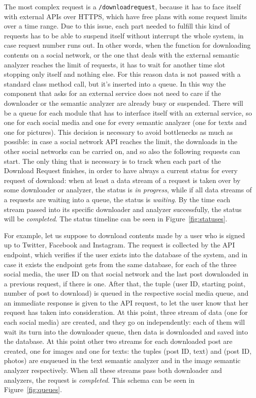 The most complex request is a \texttt{/downloadrequest}, because it has to face itself with external APIs over HTTPS, which have free plans with some request limits over a time range. Due to this issue, each part needed to fulfill this kind of requests has to be able to suspend itself without interrupt the whole system, in case request number runs out. In other words, when the function for downloading contents on a social network, or the one that deals with the external semantic analyzer reaches the limit of requests, it has to wait for another time slot stopping only itself and nothing else. For this reason data is not passed with a standard class method call, but it's inserted into a queue. In this way the component that asks for an external service does not need to care if the downloader or the semantic analyzer are already busy or suspended. There will be a queue for each module that has to interface itself with an external service, so one for each social media and one for every semantic analyzer (one for texts and one for pictures). This decision is necessary to avoid bottlenecks as much as possible: in case a social network API reaches the limit, the downloads in the other social networks can be carried on, and so also the following requests can start. The only thing that is necessary is to track when each part of the Download Request finishes, in order to have always a current status for every request of download: when at least a data stream of a request is taken over by some downloader or analyzer, the status is \emph{in progress}, while if all data streams of a requests are waiting into a queue, the status is \emph{waiting}. By the time each stream passed into its specific downloader and analyzer successfully, the status will be \emph{completed}. The status timeline can be seen in Figure~\ref{fig:statuses}.

For example, let us suppose to download contents made by a user who is signed up to Twitter, Facebook and Instagram. The request is collected by the API endpoint, which verifies if the user exists into the database of the system, and in case it exists the endpoint gets from the same database, for each of the three social media, the user ID on that social network and the last post downloaded in a previous request, if there is one. After that, the tuple (user ID, starting point, number of post to download) is queued in the respective social media queue, and an immediate response is given to the API request, to let the user know that her request has taken into consideration. At this point, three stream of data (one for each social media) are created, and they go on independently: each of them will wait its turn into the downloader queue, then data is downloaded and saved into the database. At this point other two streams for each downloaded post are created, one for images and one for texts: the tuples (post ID, text) and (post ID, photos) are enqueued in the text semantic analyzer and in the image semantic analyzer respectively. When all these streams pass both downloader and analyzers, the request is \emph{completed}. This schema can be seen in Figure~\ref{fig:queues}.

